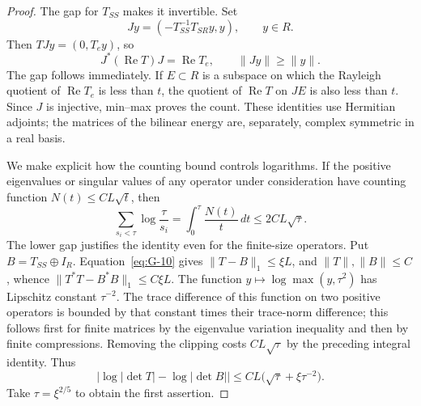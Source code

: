\begin{proof}
The gap for \(T_{SS}\) makes it invertible. Set
\[
 Jy=(-T_{SS}^{-1}T_{SR}y,y),\qquad y\in R.
\]
Then \(TJy=(0,T_ey)\), so
\[
 J^*(\operatorname{Re}T)J=\operatorname{Re}T_e,
 \qquad \|Jy\|\ge\|y\|.
\]
The gap follows immediately. If \(E\subset R\) is a subspace on which
the Rayleigh quotient of \(\operatorname{Re}T_e\) is less than \(t\),
the quotient of \(\operatorname{Re}T\) on \(JE\) is also less than
\(t\). Since \(J\) is injective, min--max proves the count. These
identities use Hermitian adjoints; the matrices of the bilinear energy
are, separately, complex symmetric in a real basis.

We make explicit how the counting bound controls logarithms. If the
positive eigenvalues or singular values of any operator under
consideration have counting function \(N(t)\le CL\sqrt t\), then
\[
 \sum_{s_i<\tau}\log\frac{\tau}{s_i}
     =\int_0^\tau\frac{N(t)}t\,dt\le2CL\sqrt\tau.
\]
The lower gap justifies the identity even for the finite-size operators.
Put \(B=T_{SS}\oplus I_R\). Equation~\eqref{eq:G-10} gives
\(\|T-B\|_1\le\xi L\), and \(\|T\|,\|B\|\le C\), whence
\(\|T^*T-B^*B\|_1\le C\xi L\).
The function \(y\mapsto\log\max(y,\tau^2)\) has Lipschitz constant
\(\tau^{-2}\). The trace difference of this function on two positive
operators is bounded by that constant times their trace-norm difference;
this follows first for finite matrices by the eigenvalue variation
inequality and then by finite compressions. Removing the clipping costs
\(CL\sqrt\tau\) by the preceding integral identity. Thus
\[
 \left|\log|\det T|-\log|\det B|\right|
       \le CL\bigl(\sqrt\tau+\xi\tau^{-2}\bigr).
\]
Take \(\tau=\xi^{2/5}\) to obtain the first assertion.


\end{proof}
